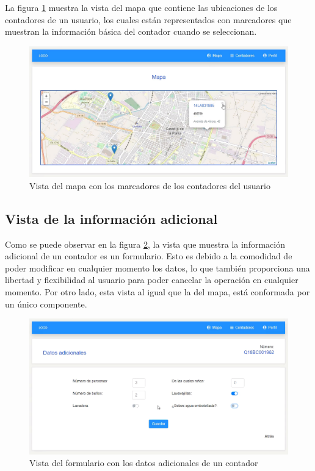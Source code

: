 \documentclass[pdftex,11pt,a4paper]{book}
\begin{document}
 La figura \ref{fig:vista-mapa} muestra la vista del mapa que contiene las ubicaciones de los contadores de un usuario, los cuales están representados con marcadores que muestran la información básica del contador cuando se seleccionan. 

 \begin{figure}[h]
 \centering
 \includegraphics [scale=0.53] {images/vistas/mapa.png}
 \caption{Vista del mapa con los marcadores de los contadores del usuario} \label{fig:vista-mapa}
 \end{figure}
 
 \subsection{Vista de la información adicional}
 
 Como se puede observar en la figura \ref{fig:vista-datos-adicionales}, la vista que muestra la información adicional de un contador es un formulario. Esto es debido a la comodidad de poder modificar en cualquier momento los datos, lo que también proporciona una libertad y flexibilidad al usuario para poder cancelar la operación en cualquier momento. Por otro lado, esta vista al igual que la del mapa, está conformada por un único componente.

 \begin{figure}[h]
 \centering
 \includegraphics [scale=0.53] {images/vistas/datos-adicionales.png}
 \caption{Vista del formulario con los datos adicionales de un contador} \label{fig:vista-datos-adicionales}
 \end{figure}
\end{document}
